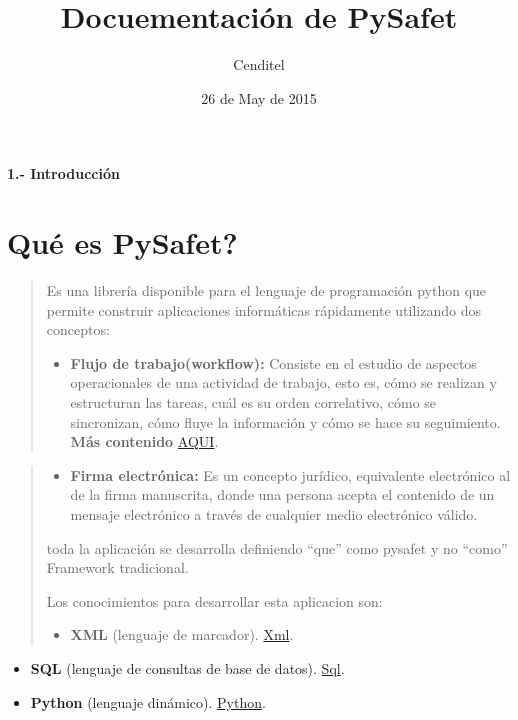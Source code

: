 \documentclass[letterpaper,11pt,spanish]{sphinxmanual}
\title{Docuementación de PySafet}
\date{26 de May de 2015}
\author{Cenditel}
\begin{document}
\maketitle
\tableofcontents
{}\label{index::doc}


\textbf{1.- Introducción}


\chapter{Qué es PySafet?}
\label{_templates/Contenido1/Introduccion:documentacion-de-pysafet}\label{_templates/Contenido1/Introduccion::doc}\label{_templates/Contenido1/Introduccion:que-es-pysafet}\begin{quote}

Es una librería disponible para el lenguaje de programación python que permite construir aplicaciones informáticas rápidamente utilizando dos conceptos:
\begin{itemize}
\item {} 
\textbf{Flujo de trabajo(workflow):} Consiste en el estudio de aspectos operacionales de una actividad de trabajo, esto es, cómo se realizan y estructuran las tareas, cuál es su orden correlativo, cómo se sincronizan, cómo fluye la información y cómo se hace su seguimiento. \textbf{Más contenido} \href{http://www.gestion.org/economia-empresa/gestion-administrativa/29867/que-es-workflow-o-flujo-de-trabajo/}{AQUI}.

\end{itemize}
\end{quote}
\begin{quote}
\begin{itemize}
\item {} 
\textbf{Firma electrónica:} Es un concepto jurídico, equivalente electrónico al de la firma manuscrita, donde una persona acepta el contenido de un mensaje electrónico a través de cualquier medio electrónico válido.

\end{itemize}

toda la aplicación se desarrolla definiendo ``que'' como pysafet y no ``como'' Framework tradicional.

Los conocimientos para desarrollar esta aplicacion son:
\begin{itemize}
\item {} 
\textbf{XML} (lenguaje de marcador). \href{http://es.wikipedia.org/wiki/Extensible\_Markup\_Language}{Xml}.

\end{itemize}
\end{quote}
\begin{itemize}
\item {} 
\textbf{SQL} (lenguaje de consultas  de base de datos). \href{http://www.1keydata.com/es/sql/}{Sql}.

\end{itemize}
\begin{itemize}
\item {} 
\textbf{Python} (lenguaje dinámico). \href{http://es.wikipedia.org/wiki/Python}{Python}.

\end{itemize}
\end{document}
